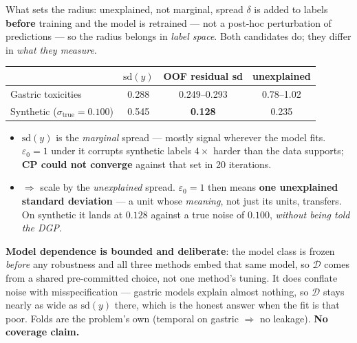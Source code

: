 \documentclass{beamer}
\begin{document}
\begin{frame}{What sets the radius: unexplained, not marginal, spread}
  \small
  $\delta$ is added to labels \textbf{before} training and the model is retrained
  --- not a post-hoc perturbation of predictions --- so the radius belongs in
  \emph{label space}. Both candidates do; they differ in \emph{what they measure}.
  \begin{center}\small
  \begin{tabular}{@{}lccc@{}}
    \toprule
    & $\mathrm{sd}(y)$ & OOF residual sd & unexplained \\
    \midrule
    Gastric toxicities & 0.288 & 0.249--0.293 & 0.78--1.02 \\
    Synthetic ($\sigma_{\text{true}}=0.100$) & 0.545 & \textbf{0.128} & 0.235 \\
    \bottomrule
  \end{tabular}
  \end{center}
  \medskip
  \begin{itemize}
    \item $\mathrm{sd}(y)$ is the \emph{marginal} spread --- mostly signal wherever
      the model fits. $\varepsilon_0=1$ under it corrupts synthetic labels
      $4\times$ harder than the data supports; \textbf{CP could not converge}
      against that set in 20 iterations.
    \item $\Rightarrow$ scale by the \emph{unexplained} spread. $\varepsilon_0=1$
      then means \textbf{one unexplained standard deviation} --- a unit whose
      \emph{meaning}, not just its units, transfers. On synthetic it lands at
      $0.128$ against a true noise of $0.100$, \emph{without being told the DGP}.
  \end{itemize}
  \medskip
  \footnotesize
  \textbf{Model dependence is bounded and deliberate}: the model class is frozen
  \emph{before} any robustness and all three methods embed that same model, so
  $\mathcal D$ comes from a shared pre-committed choice, not one method's tuning.
  It does conflate noise with misspecification --- gastric models explain almost
  nothing, so $\mathcal D$ stays nearly as wide as $\mathrm{sd}(y)$ there, which is
  the honest answer when the fit is that poor. Folds are the problem's own
  (temporal on gastric $\Rightarrow$ no leakage). \textbf{No coverage claim.}
\end{frame}
\end{document}
